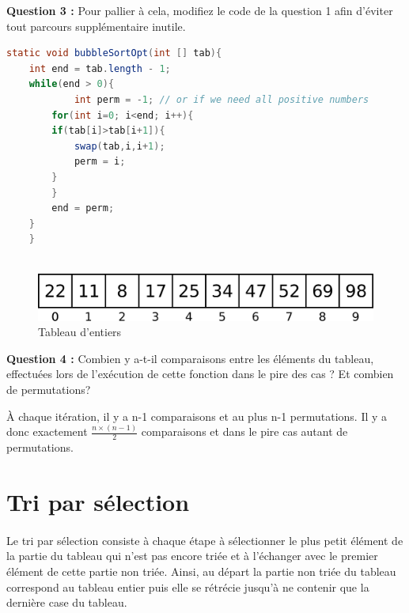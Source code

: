 \documentclass[iutinfo,a4paper,nocorrections,10pt]{ustl-tdtp}
\begin{document}
\textbf{Question 3 :} Pour pallier à cela, modifiez le code de la question 1 afin d'éviter tout parcours supplémentaire inutile.
\begin{correction}
{\color{red}

\begin{lstlisting}[language=java]
    static void bubbleSortOpt(int [] tab){
	int end = tab.length - 1;
	while(end > 0){
            int perm = -1; // or if we need all positive numbers
 	    for(int i=0; i<end; i++){
		if(tab[i]>tab[i+1]){
		    swap(tab,i,i+1);
		    perm = i;
		}
	    }
	    end = perm;
	}
    }
  
\end{lstlisting}
}
\end{correction}


\begin{figure}[!h]
\centering
\label{tableau}
\includegraphics[scale=0.5]{array}
\caption{Tableau d'entiers}
\end{figure}

\textbf{Question 4 :} Combien y a-t-il comparaisons entre les éléments du tableau, effectuées lors de l'exécution de cette fonction dans le pire des cas ? Et combien de permutations?

\begin{correction}
{\color{red}
À chaque itération, il y a n-1 comparaisons et au plus n-1 permutations. Il y a donc exactement $\frac{n \times (n-1)}{2}$ comparaisons et dans le pire cas autant de permutations.
}
\end{correction}

\section{Tri par sélection}

\paragraph{} Le tri par sélection consiste à chaque étape à sélectionner le plus petit élément de la partie du tableau qui n'est pas
encore triée et à l'échanger avec le premier élément de cette partie non triée. Ainsi, au départ la partie non triée du tableau correspond au tableau entier puis elle se rétrécie jusqu'à ne contenir que la dernière case du tableau. \newline
\end{document}
